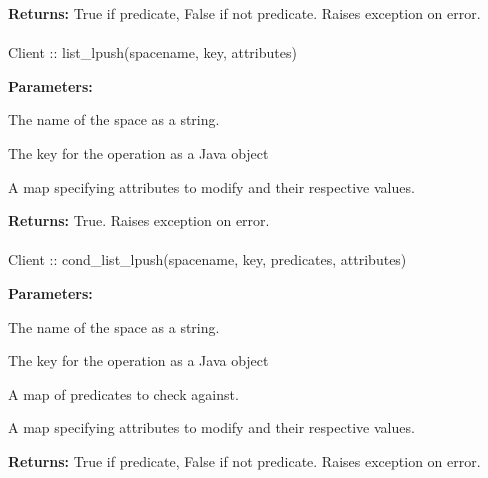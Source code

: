 \noindent\textbf{Returns:}
True if predicate, False if not predicate.  Raises exception on error.

\paragraph{}
\label{api:java:list_lpush}
\begin{javacode}
Client :: list_lpush(spacename, key, attributes)
\end{javacode}


\noindent\textbf{Parameters:}
\begin{description}[labelindent=\widthof{{\code{attributes}}},leftmargin=*,noitemsep,nolistsep,align=right]
\item[\code{spacename}] The name of the space as a string.
\item[\code{key}] The key for the operation as a Java object
\item[\code{attributes}] A map specifying attributes to modify and their respective values.
\end{description}

\noindent\textbf{Returns:}
True.  Raises exception on error.

\paragraph{}
\label{api:java:cond_list_lpush}
\begin{javacode}
Client :: cond_list_lpush(spacename, key, predicates, attributes)
\end{javacode}


\noindent\textbf{Parameters:}
\begin{description}[labelindent=\widthof{{\code{predicates}}},leftmargin=*,noitemsep,nolistsep,align=right]
\item[\code{spacename}] The name of the space as a string.
\item[\code{key}] The key for the operation as a Java object
\item[\code{predicates}] A map of predicates to check against.
\item[\code{attributes}] A map specifying attributes to modify and their respective values.
\end{description}

\noindent\textbf{Returns:}
True if predicate, False if not predicate.  Raises exception on error.

